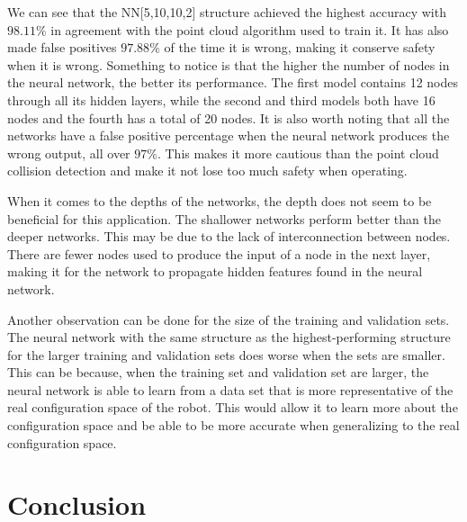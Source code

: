 \documentclass[conference]{IEEEtran}
\begin{document}
We can see that the NN[5,10,10,2] structure achieved the highest accuracy with $98.11\%$ in agreement with the point cloud algorithm used to train it. It has also made false positives $97.88\%$ of the time it is wrong, making it conserve safety when it is wrong. Something to notice is that the higher the number of nodes in the neural network, the better its performance. The first model contains 12 nodes through all its hidden layers, while the second and third models both have 16 nodes and the fourth has a total of 20 nodes. It is also worth noting that all the networks have a false positive percentage when the neural network produces the wrong output, all over $97\%$. This makes it more cautious than the point cloud collision detection and make it not lose too much safety when operating. 

When it comes to the depths of the networks, the depth does not seem to be beneficial for this application. The shallower networks perform better than the deeper networks. This may be due to the lack of interconnection between nodes. There are fewer nodes used to produce the input of a node in the next layer, making it for the network to propagate hidden features found in the neural network. 

Another observation can be done for the size of the training and validation sets. The neural network with the same structure as the highest-performing structure for the larger training and validation sets does worse when the sets are smaller. This can be because, when the training set and validation set are larger, the neural network is able to learn from a data set that is more representative of the real configuration space of the robot. This would allow it to learn more about the configuration space and be able to be more accurate when generalizing to the real configuration space. 

\section{Conclusion}
\end{document}
